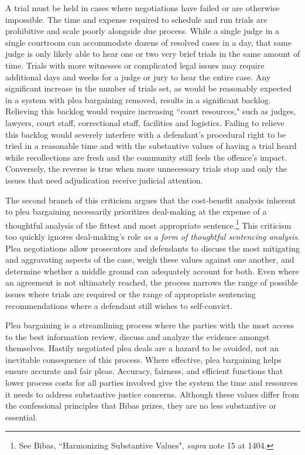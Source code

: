 A trial must be held in cases where negotiations have failed or are otherwise impossible. The time and expense required to schedule and run trials are prohibitive and scale poorly alongside due process. While a single judge in a single courtroom can accommodate dozens of resolved cases in a day, that same judge is only likely able to hear one or two very brief trials in the same amount of time. Trials with more witnesses or complicated legal issues may require additional days and weeks for a judge or jury to hear the entire case. Any significant increase in the number of trials set, as would be reasonably expected in a system with plea bargaining removed, results in a significant backlog. Relieving this backlog would require increasing ``court resources," such as judges, lawyers, court staff, correctional staff, facilities and logistics. Failing to relieve this backlog would severely interfere with a defendant's procedural right to be tried in a reasonable time and with the substantive values of having a trial heard while recollections are fresh and the community still feels the offence's impact. Conversely, the reverse is true when more unnecessary trials stop and only the issues that need adjudication receive judicial attention.

The second branch of this criticism argues that the cost-benefit analysis inherent to plea bargaining necessarily prioritizes deal-making at the expense of a thoughtful analysis of the fittest and most appropriate sentence.\footnote{See Bibas, ``Harmonizing Substantive Values", \textit{supra} note 15 at 1404.} This criticism too quickly ignores deal-making's role \textit{as a form of thoughtful sentencing analysis}. Plea negotiations allow prosecutors and defendants to discuss the most mitigating and aggravating aspects of the case, weigh these values against one another, and determine whether a middle ground can adequately account for both. Even where an agreement is not ultimately reached, the process narrows the range of possible issues where trials are required or the range of appropriate sentencing recommendations where a defendant still wishes to self-convict.

Plea bargaining is a streamlining process where the parties with the most access to the best information review, discuss and analyze the evidence amongst themselves. Hastily negotiated plea deals are a hazard to be avoided, not an inevitable consequence of this process. Where effective, plea bargaining helps ensure accurate and fair pleas. Accuracy, fairness, and efficient functions that lower process costs for all parties involved give the system the time and resources it needs to address substantive justice concerns. Although these values differ from the confessional principles that Bibas prizes, they are no less substantive or essential.

